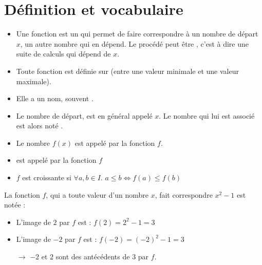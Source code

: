 \documentclass[12pt,a4paper]{article}
\date{}
\title{}
\begin{document}


\section{Définition et vocabulaire}


\begin{mydefs}
	
	
	
	\begin{itemize}
		\item Une fonction est un  qui permet de faire correspondre à un nombre de départ $x$, un autre nombre qui en dépend. Le procédé peut être , c'est à dire une suite de calculs qui dépend de $x$.
		
		\item Toute fonction est définie sur  (entre une valeur minimale et une valeur maximale).
		
		\item Elle a un nom, souvent .
		
		\item Le nombre de départ, est en général appelé $x$. Le nombre qui lui est associé est alors noté .
		
		\item Le nombre $f(x)$ est appelé  par la fonction $f$.
		
		\item {} est appelé  par la fonction $f$
		
		\item $f$ est croissante si $ \forall a, b \in I.$ $ a \leq b \Leftrightarrow f(a) \leq f(b) $ 
	\end{itemize}
	
	
	

\end{mydefs}

	\begin{myex}
		La fonction $f$, qui a toute valeur d'un nombre $x$, fait correspondre $x^2-1$ est notée :
	\begin{itemize}
		\item L'image de $2$ par $f$ est : $f(2) = 2^2-1=3$
		\item L'image de $-2$ par $f$ est : $f(-2) = (-2)^2-1=3$
		\item[$\rightarrow$] $-2$ et $2$ sont des antécédents de $3$ par $f$.
		
	\end{itemize}
	\end{myex}
\end{document}
